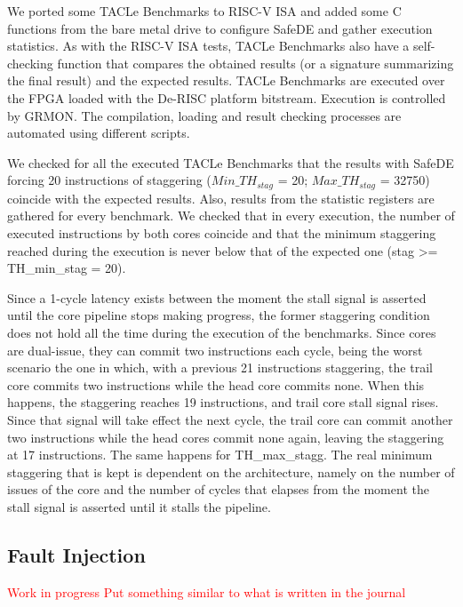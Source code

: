 We ported some TACLe Benchmarks to RISC-V ISA and added some C functions from the bare metal drive to configure SafeDE and gather execution statistics. As with the RISC-V ISA tests, TACLe Benchmarks also have a self-checking function that compares the obtained results (or a signature summarizing the final result) and the expected results. TACLe Benchmarks are executed over the FPGA loaded with the De-RISC platform bitstream. Execution is controlled by GRMON. The compilation, loading and result checking processes are automated using different scripts. 

We checked for all the executed TACLe Benchmarks that the results with SafeDE forcing 20 instructions of staggering ($Min\_TH_{stag}$ = 20; $Max\_TH_{stag}$ = 32750) coincide with the expected results. Also, results from the statistic registers are gathered for every benchmark. We checked that in every execution, the number of executed instructions by both cores coincide and that the minimum staggering reached during the execution is never below that of the expected one (stag >= TH\_min\_stag = 20). 

Since a 1-cycle latency exists between the moment the stall signal is asserted until the core pipeline stops making progress, the former staggering condition does not hold all the time during the execution of the benchmarks. Since cores are dual-issue, they can commit two instructions each cycle, being the worst scenario the one in which, with a previous 21 instructions staggering, the trail core commits two instructions while the head core commits none. When this happens, the staggering reaches 19 instructions, and trail core stall signal rises. Since that signal will take effect the next cycle, the trail core can commit another two instructions while the head cores commit none again, leaving the staggering at 17 instructions. The same happens for TH\_max\_stagg. The real minimum staggering that is kept is dependent on the architecture, namely on the number of issues of the core and the number of cycles that elapses from the moment the stall signal is asserted until it stalls the pipeline. 

\bigskip



\subsection{Fault Injection}
\textcolor{red}{Work in progress}
\textcolor{red}{Put something similar to what is written in the journal}

